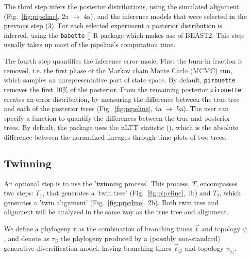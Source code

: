 The third step infers the posterior distributions,
using the simulated alignment (Fig.~\ref{fig:pipeline}, 2a $\rightarrow$ 4a),
and the inference models that were selected in the previous step (3). 
For each selected experiment a posterior distribution is inferred, using the 
\verb;babette; [\cite{bilderbeek2018babette}] R package which makes use of BEAST2. 
This step usually takes up most of the pipeline's computation time.

The fourth step quantifies the inference error made. 
First the burn-in fraction is removed, i.e. the first phase of the 
Markov chain Monte Carlo (MCMC) run,
which samples an unrepresentative part of state space. 
By default, \verb;pirouette; 
removes the first 10\% of the posterior.
From the remaining posterior \verb;pirouette; 
creates an error distribution, by measuring the difference
between the true tree and each of the posterior 
trees (Fig.~\ref{fig:pipeline}, 4a $\rightarrow$ 5a).
The user can specify a function to quantify the differences between
the true and posterior trees. By default, the package uses the nLTT 
statistic (\cite{janzen2015approximate}), which is the absolute difference
between the normalized lineages-through-time plots of two trees.

\subsection{Twinning}\label{subsec:twinning}

An optional step is to use the 'twinning process'.
This process, $T$, encompasses two steps:
$T_1$, that generates a 'twin tree' (Fig.~\ref{fig:pipeline}, 1b) 
and $T_2$, which generates a 'twin alignment' (Fig.~\ref{fig:pipeline}, 2b).
Both twin tree and alignment will be analyzed in the same way 
as the true tree and alignment.

We define a phylogeny $\tau$ as the combination of
branching times $\Vec{t}$ and topology $\psi$, 
and denote as $\tau_{\mathit{G}}$ the phylogeny 
produced by a (possibly non-standard) generative diversification model, 
having branching times $\Vec{t}_{\mathit{G}}$ and 
topology $\psi_{\mathit{G}}$.

